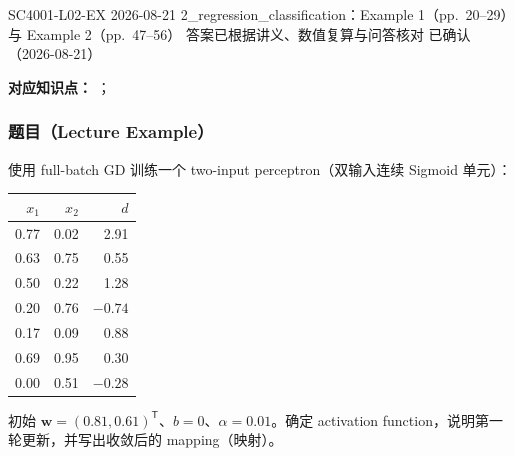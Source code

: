 

\examplemeta
  {SC4001-L02-EX}
  {2026-08-21}
  {2\_regression\_classification：Example 1（pp.~20--29）与 Example 2（pp.~47--56）}
  {答案已根据讲义、数值复算与问答核对}
  {已确认（2026-08-21）}


\textbf{对应知识点：}
；

\subsubsection*{题目（Lecture Example）}

使用 full-batch GD 训练一个 two-input perceptron（双输入连续 Sigmoid 单元）：
\begin{center}
\small
\begin{tabular}{@{}rrr@{}}
  \toprule
  $x_1$ & $x_2$ & $d$ \\
  \midrule
  0.77 & 0.02 & 2.91 \\
  0.63 & 0.75 & 0.55 \\
  0.50 & 0.22 & 1.28 \\
  0.20 & 0.76 & $-0.74$ \\
  0.17 & 0.09 & 0.88 \\
  0.69 & 0.95 & 0.30 \\
  0.00 & 0.51 & $-0.28$ \\
  \bottomrule
\end{tabular}
\end{center}
初始 $\bm w=(0.81,0.61)^{\mathsf T}$、$b=0$、$\alpha=0.01$。确定 activation function，说明第一轮更新，并写出收敛后的 mapping（映射）。

